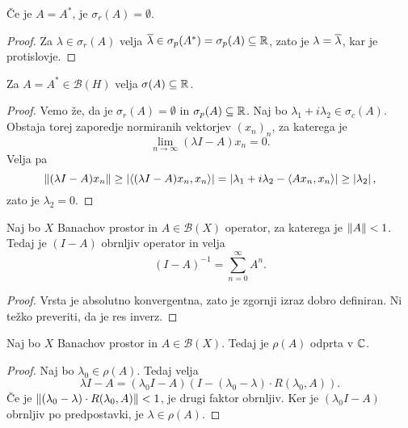 \begin{posledica}
Če je $A = A^*$, je $\sigma_r(A) = \emptyset$.
\end{posledica}

\begin{proof}
Za $\lambda \in \sigma_r(A)$ velja
$\overline{\lambda} \in \sigma_p(A^*) = \sigma_p(A) \subseteq \mathbb{R}$,
zato je $\lambda = \overline{\lambda}$, kar je protislovje.
\end{proof}

\begin{izrek}
Za $A = A^* \in \mathcal{B}(H)$ velja $\sigma(A) \subseteq \mathbb{R}$.
\end{izrek}

\begin{proof}
Vemo že, da je $\sigma_r(A) = \emptyset$ in
$\sigma_p(A) \subseteq \mathbb{R}$. Naj bo
$\lambda_1 + i \lambda_2 \in \sigma_c(A)$. Obstaja torej zaporedje
normiranih vektorjev $(x_n)_n$, za katerega je
\[
\lim_{n \to \infty} (\lambda I - A) x_n = 0.
\]
Velja pa
\[
\left\lVert (\lambda I - A) x_n\right\rVert \geq
\left\lvert \left\langle (\lambda I - A) x_n, x_n\right\rangle\right\rvert =
\left\lvert \lambda_1 + i \lambda_2 - \left\langle Ax_n, x_n\right\rangle\right\rvert \geq
\left\lvert \lambda_2\right\rvert,
\]
zato je $\lambda_2 = 0$.
\end{proof}

\begin{izrek}
Naj bo $X$ Banachov prostor in $A \in \mathcal{B}(X)$ operator, za
katerega je $\left\lVert A\right\rVert < 1$. Tedaj je $(I-A)$ obrnljiv operator in
velja
\[
(I-A)^{-1} = \sum_{n=0}^\infty A^n.
\]
\end{izrek}

\begin{proof}
Vrsta je absolutno konvergentna, zato je zgornji izraz dobro
definiran. Ni težko preveriti, da je res inverz.
\end{proof}

\begin{trditev}
Naj bo $X$ Banachov prostor in $A \in \mathcal{B}(X)$. Tedaj je
$\rho(A)$ odprta v $\mathbb{C}$.
\end{trditev}

\begin{proof}
Naj bo $\lambda_0 \in \rho(A)$. Tedaj velja
\[
\lambda I - A =
(\lambda_0 I - A)(I - (\lambda_0 - \lambda) \cdot R(\lambda_0, A)).
\]
Če je $\left\lVert (\lambda_0 - \lambda) \cdot R(\lambda_0, A)\right\rVert < 1$,
je drugi faktor obrnljiv. Ker je $(\lambda_0 I - A)$ obrnljiv po
predpostavki, je $\lambda \in \rho(A)$.
\end{proof}

